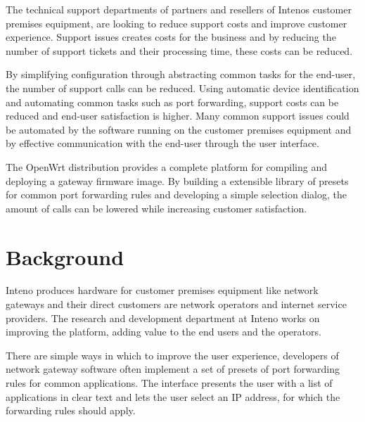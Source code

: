 \documentclass[a4paper,11pt]{kth-mag}
\begin{document}
The technical support departments of partners and resellers of Intenos
customer premises equipment, are looking to reduce support costs and improve customer experience. 
Support issues creates costs for the business and by reducing the number of support tickets and their processing time, these costs can be reduced.

By simplifying configuration through abstracting common tasks for the end-user, the number of support calls can be reduced.
Using automatic device identification and automating common tasks such as port forwarding, support costs can be reduced and end-user satisfaction is higher.
Many common support issues could be automated by the software running on the customer premises equipment and by effective communication with the end-user through the user interface.

The OpenWrt distribution provides a complete platform for compiling and
deploying a gateway firmware image.
By building a extensible library of presets for common port forwarding rules and developing a simple selection dialog, the amount of calls can be lowered while increasing customer satisfaction.




\chapter{Background}

Inteno produces hardware for customer premises equipment like network gateways and their direct customers are network operators and internet service providers.
The research and development department at Inteno works on improving the platform, adding value to the end users and the operators.

There are simple ways in which to improve the user experience, developers of network gateway software often implement a set of presets of port forwarding rules for common applications.
The interface presents the user with a list of applications in clear text and lets the user select an IP address, for which the forwarding rules should apply.
\end{document}
